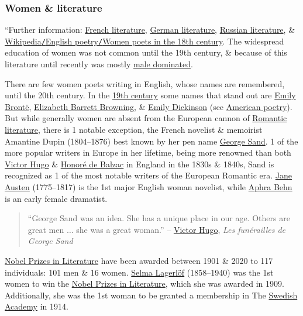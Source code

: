 \documentclass[oneside]{book}
\numberwithin{equation}{section}
\begin{document}
\subsubsection{Women \& literature}
``Further information: \href{https://en.wikipedia.org/wiki/French_literature}{French literature}, \href{https://en.wikipedia.org/wiki/German_literature}{German literature}, \href{https://en.wikipedia.org/wiki/Russian_literature}{Russian literature}, \& \href{https://en.wikipedia.org/wiki/English_poetry#Women_poets_in_the_18th_century}{Wikipedia\texttt{/}English poetry\texttt{/}Women poets in the 18th century}. The widespread education of women was not common until the 19th century, \& because of this literature until recently was mostly \href{https://en.wikipedia.org/wiki/Western_canon#Historical_exclusion_of_women}{male dominated}.

There are few women poets writing in English, whose names are remembered, until the 20th century. In the \href{https://en.wikipedia.org/wiki/English_poetry#Victorian_poetry}{19th century} some names that stand out are \href{https://en.wikipedia.org/wiki/Emily_Bront%C3%AB}{Emily Bront\"e}, \href{https://en.wikipedia.org/wiki/Elizabeth_Barrett_Browning}{Elizabeth Barrett Browning}, \& \href{https://en.wikipedia.org/wiki/Emily_Dickinson}{Emily Dickinson} (see \href{https://en.wikipedia.org/wiki/American_poetry}{American poetry}). But while generally women are absent from the European cannon of \href{https://en.wikipedia.org/wiki/Romantic_poetry}{Romantic literature}, there is 1 notable exception, the French novelist \& memoirist Amantine Dupin (1804--1876) best known by her pen name \href{https://en.wikipedia.org/wiki/George_Sand}{George Sand}. 1 of the more popular writers in Europe in her lifetime, being more renowned than both \href{https://en.wikipedia.org/wiki/Victor_Hugo}{Victor Hugo} \& \href{https://en.wikipedia.org/wiki/Honor%C3%A9_de_Balzac}{Honor\'e de Balzac} in England in the 1830s \& 1840s, Sand is recognized as 1 of the most notable writers of the European Romantic era. \href{https://en.wikipedia.org/wiki/Jane_Austen}{Jane Austen} (1775--1817) is the 1st major English woman novelist, while \href{https://en.wikipedia.org/wiki/Aphra_Behn}{Aphra Behn} is an early female dramatist.
\begin{quotation}
	``George Sand was an idea. She has a unique place in our age. Others are great men $\ldots$ she was a great woman.'' -- \href{https://en.wikipedia.org/wiki/Victor_Hugo}{Victor Hugo}, \textit{Les fun\'erailles de George Sand}
\end{quotation}
\href{https://en.wikipedia.org/wiki/Nobel_Prize_in_Literature}{Nobel Prizes in Literature} have been awarded between 1901 \& 2020 to 117 individuals: 101 men \& 16 women. \href{https://en.wikipedia.org/wiki/Selma_Lagerl%C3%B6f}{Selma Lagerl\"of} (1858--1940) was the 1st women to win the \href{https://en.wikipedia.org/wiki/Nobel_Prize_in_Literature}{Nobel Prizes in Literature}, which she was awarded in 1909. Additionally, she was the 1st woman to be granted a membership in The \href{https://en.wikipedia.org/wiki/Swedish_Academy}{Swedish Academy} in 1914.
\end{document}
